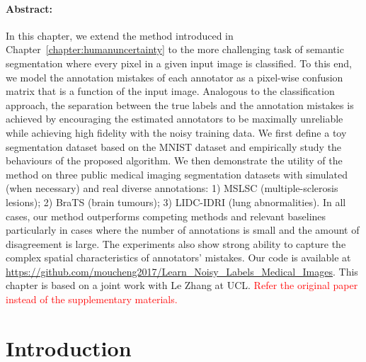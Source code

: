 \paragraph{Abstract: }
In this chapter, we extend the method introduced in Chapter~\ref{chapter:humanuncertainty} to the more challenging task of semantic segmentation where every pixel in a given input image is classified. To this end, we model the annotation mistakes of each annotator as a pixel-wise confusion matrix that is a function of the input image. Analogous to the classification approach, the separation between the true labels and the annotation mistakes is achieved by encouraging the estimated annotators to be maximally unreliable while achieving high fidelity with the noisy training data. We first define a toy segmentation dataset based on the MNIST dataset and empirically study the behaviours of the proposed algorithm. We then demonstrate the utility of the method on three public medical imaging segmentation datasets with simulated (when necessary) and real diverse annotations: 1) MSLSC (multiple-sclerosis lesions); 2) BraTS (brain tumours); 3) LIDC-IDRI (lung abnormalities). In all cases, our method outperforms competing methods and relevant baselines particularly in cases where the number of annotations is small and the amount of disagreement is large. The experiments also show strong ability to capture the complex spatial characteristics of annotators' mistakes. Our code is available at \url{https://github.com/moucheng2017/Learn_Noisy_Labels_Medical_Images}. This chapter is based on a joint work \cite{zhang2020disentangling} with Le Zhang at UCL. \textcolor{red}{Refer the original paper instead of the supplementary materials.}


\section{Introduction}



